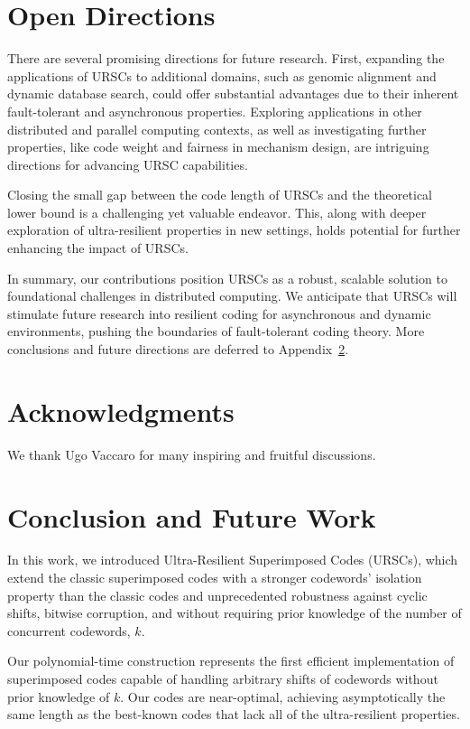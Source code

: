 \documentclass[11pt]{article}
\begin{document}
\section{Open Directions}

There are several promising directions for future research. First, expanding the applications of 
URSCs to additional domains, such as genomic alignment and dynamic database search, could offer 
substantial advantages due to their inherent fault-tolerant and asynchronous properties. 
Exploring applications in other distributed and parallel computing contexts, as well as investigating 
further properties, like code weight and fairness in mechanism design, are intriguing directions for 
advancing URSC capabilities.

Closing the small gap between the code length of URSCs and the theoretical lower bound is a challenging 
yet valuable endeavor. This, along with deeper exploration of ultra-resilient properties in new settings, 
holds potential for further enhancing the impact of URSCs.

In summary, our contributions position URSCs as a robust, scalable solution to foundational challenges 
in distributed computing. We anticipate that URSCs will stimulate future research into resilient 
coding for asynchronous and dynamic environments, pushing the boundaries of fault-tolerant coding theory.
More conclusions and future directions are deferred to Appendix~\ref{sec:final}.


\section*{Acknowledgments}
We thank Ugo Vaccaro for many inspiring and fruitful discussions.


\iffalse
\section{Conclusion and Future Work}
\label{sec:final}


In this work, we introduced Ultra-Resilient Superimposed Codes (URSCs), which extend the classic 
superimposed codes with a stronger codewords' isolation property than the classic codes and
unprecedented robustness against cyclic shifts, bitwise corruption, and without 
requiring prior knowledge of the number of concurrent codewords, $k$. 

Our polynomial-time construction represents the first efficient implementation of superimposed codes 
capable of handling arbitrary shifts of codewords without prior knowledge of $k$. Our codes are near-optimal, 
achieving asymptotically the same length as the best-known codes that lack all of the 
ultra-resilient properties.
\end{document}
